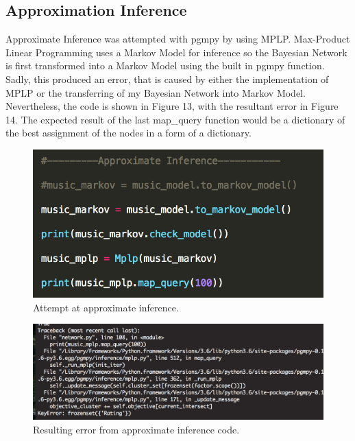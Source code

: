 \documentclass[12pt, letter]{article}
\begin{document}
\FloatBarrier

\subsection{Approximation Inference}

Approximate Inference was attempted with pgmpy by using MPLP. Max-Product Linear Programming uses a Markov Model for inference so the Bayesian Network is first transformed into a Markov Model using the built in pgmpy function. Sadly, this produced an error, that is caused by either the implementation of MPLP or the transferring of my Bayesian Network into Markov Model. Nevertheless, the code is shown in Figure 13, with the resultant error in Figure 14. The expected result of the last map\_query function would be a dictionary of the best assignment of the nodes in a form of a dictionary. 

 \begin{figure}[htb]
  \centering
  \includegraphics[width=0.6 \textwidth]{./figures/approximate_inference.png}
  \caption{Attempt at approximate inference.}
\end{figure}

 \begin{figure}[htb]
  \centering
  \includegraphics[width=0.75 \textwidth]{./figures/error_approx.png}
  \caption{Resulting error from approximate inference code.}
\end{figure}

\FloatBarrier
\end{document}
